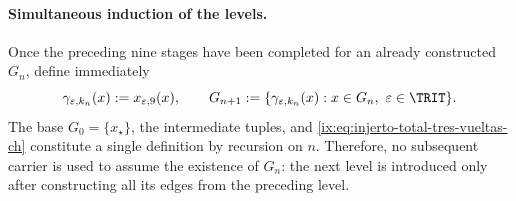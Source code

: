 \paragraph{Simultaneous induction of the levels.}
Once the preceding nine stages have been completed for an already constructed
\(G_n\), define immediately
\begin{equation}
 \gamma_{\varepsilon,k_n}(x):=x_{\varepsilon,9}(x),\qquad
 G_{n+1}:=\{\gamma_{\varepsilon,k_n}(x):
       x\in G_n,\ \varepsilon\in\TRIT\}.
 \label{ix:eq:injerto-total-tres-vueltas-ch}
\end{equation}
\label{ix:eq:tres-vueltas-tpk-ch}
The base \(G_0=\{x_\star\}\), the intermediate tuples, and
\eqref{ix:eq:injerto-total-tres-vueltas-ch} constitute a single definition by
recursion on \(n\). Therefore, no subsequent carrier is used to assume the
existence of \(G_n\): the next level is introduced only after constructing all
its edges from the preceding level.

